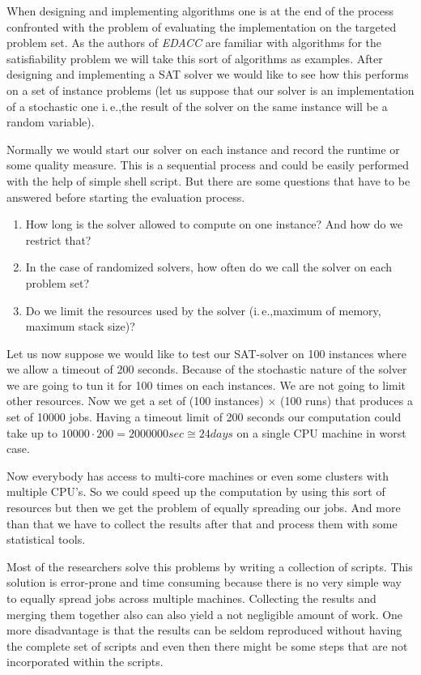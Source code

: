 \documentclass[twoside,a4paper]{refart}
\theoremstyle{dotless}
\newcommand{\ie}{i.\,e.,}
\newcommand{\edacc}{\textit{EDACC} }
\newcounter{ex}
\newcommand{\Eexample}{\color{green}Example \arabic{ex}:  \addtocounter{ex}{1}}
\begin{document}
When designing and implementing algorithms one is at the end of the process confronted with the problem of evaluating the implementation on the targeted problem set. As the authors of \edacc are familiar with algorithms for the satisfiability problem we will take this sort of algorithms as examples. After designing and implementing a SAT solver we would like to see how this performs on a set of instance problems (let us suppose that our solver is an implementation of a stochastic one \ie the result of the solver on the same instance will be a random variable).

Normally we would start our solver on each instance and record the runtime or some quality measure. This is a sequential process and could be easily performed with the help of simple shell script. But there are some questions that have to be answered before starting the evaluation process. 

\begin{enumerate}
\item How long is the solver allowed to compute on one instance? And how do we restrict that?
\item In the case of randomized solvers, how often do we call the solver on each problem set?
\item Do we limit the resources used by the solver (\ie maximum of memory, maximum stack size)?
\end{enumerate}

Let us now suppose we would like to test our SAT-solver on 100 instances where we allow a timeout of 200 seconds. \marginlabel{\Eexample}  Because of the stochastic nature of the solver we are going to tun it for 100 times on each instances. We are not going to limit other resources. Now we get a set of (100 instances) $\times$ (100 runs) that produces a set of 10000 jobs. Having a timeout limit of 200 seconds our computation could take up to $10000\cdot 200=2000000sec\cong24 days$ on a single CPU machine in worst case. 

Now everybody has access to multi-core machines or even some clusters with multiple CPU's. So we could speed up the computation by using this sort of resources but then we get the problem of equally spreading our jobs. And more than that we have to collect the results after that and process them with some statistical tools. 

Most of the researchers solve this problems by writing a collection of scripts. This solution is error-prone and time consuming because there is no very simple way to equally spread jobs across multiple machines. Collecting the results and merging them together also can also yield a not negligible amount of work. 
One more disadvantage is that the results can be seldom reproduced without having the complete set of scripts and even then there might be some steps that are not incorporated within the scripts. 
\end{document}
